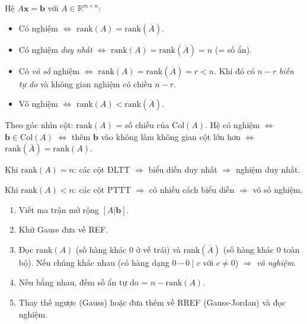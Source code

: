 \documentclass[12pt,a4paper]{article}
\begin{document}
\begin{dinhly}[title={Kronecker-Capelli}]
Hệ $A\mathbf{x} = \mathbf{b}$ với $A \in \mathbb{R}^{m\times n}$:
\begin{itemize}
  \item Có nghiệm $\Leftrightarrow$ $\mathrm{rank}(A) = \mathrm{rank}(\overline{A})$.
  \item Có nghiệm \emph{duy nhất} $\Leftrightarrow$ $\mathrm{rank}(A) = \mathrm{rank}(\overline{A}) = n$ (= số ẩn).
  \item Có \emph{vô số} nghiệm $\Leftrightarrow$ $\mathrm{rank}(A) = \mathrm{rank}(\overline{A}) = r < n$. Khi đó có $n - r$ \emph{biến tự do} và không gian nghiệm có chiều $n-r$.
  \item Vô nghiệm $\Leftrightarrow$ $\mathrm{rank}(A) < \mathrm{rank}(\overline{A})$.
\end{itemize}
\end{dinhly}

\begin{ynghia}[title={Trực giác Kronecker-Capelli}]
Theo góc nhìn cột: $\mathrm{rank}(A)$ = số chiều của $\mathrm{Col}(A)$. Hệ có nghiệm $\Leftrightarrow$ $\mathbf{b} \in \mathrm{Col}(A)$ $\Leftrightarrow$ thêm $\mathbf{b}$ vào không làm không gian cột lớn hơn $\Leftrightarrow$ $\mathrm{rank}(\overline{A}) = \mathrm{rank}(A)$.

Khi $\mathrm{rank}(A) = n$: các cột ĐLTT $\Rightarrow$ biểu diễn duy nhất $\Rightarrow$ nghiệm duy nhất.

Khi $\mathrm{rank}(A) < n$: các cột PTTT $\Rightarrow$ có nhiều cách biểu diễn $\Rightarrow$ vô số nghiệm.
\end{ynghia}

\begin{phuongphap}[title={Quy trình giải hệ $A\mathbf{x} = \mathbf{b}$}]
\begin{enumerate}
  \item Viết ma trận mở rộng $[A | \mathbf{b}]$.
  \item Khử Gauss đưa về REF.
  \item Đọc $\mathrm{rank}(A)$ (số hàng khác 0 ở vế trái) và $\mathrm{rank}(\overline{A})$ (số hàng khác 0 toàn bộ). Nếu chúng khác nhau (có hàng dạng $0\,\cdots\,0 \mid c$ với $c \ne 0$) $\Rightarrow$ \emph{vô nghiệm}.
  \item Nếu bằng nhau, đếm số ẩn tự do = $n - \mathrm{rank}(A)$.
  \item Thay thế ngược (Gauss) hoặc đưa thêm về RREF (Gauss-Jordan) và đọc nghiệm.
\end{enumerate}
\end{phuongphap}
\end{document}
